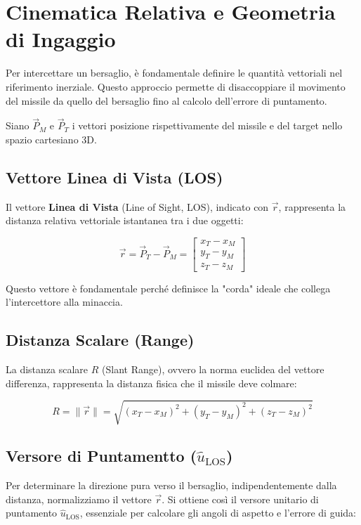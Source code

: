 \documentclass[12pt,a4paper]{article}
\begin{document}
\section{Cinematica Relativa e Geometria di Ingaggio}

Per intercettare un bersaglio, è fondamentale definire le quantità vettoriali nel riferimento inerziale. Questo approccio permette di disaccoppiare il movimento del missile da quello del bersaglio fino al calcolo dell'errore di puntamento.



Siano $\vec{P}_M$ e $\vec{P}_T$ i vettori posizione rispettivamente del missile e del target nello spazio cartesiano 3D.

\subsection{Vettore Linea di Vista (LOS)}
Il vettore \textbf{Linea di Vista} (Line of Sight, LOS), indicato con $\vec{r}$, rappresenta la distanza relativa vettoriale istantanea tra i due oggetti:

\begin{equation}
    \vec{r} = \vec{P}_T - \vec{P}_M = 
    \begin{bmatrix} 
        x_T - x_M \\ 
        y_T - y_M \\ 
        z_T - z_M 
    \end{bmatrix}
\end{equation}

Questo vettore è fondamentale perché definisce la "corda" ideale che collega l'intercettore alla minaccia.

\subsection{Distanza Scalare (Range)}
La distanza scalare $R$ (Slant Range), ovvero la norma euclidea del vettore differenza, rappresenta la distanza fisica che il missile deve colmare:

\begin{equation}
    R = \|\vec{r}\| = \sqrt{(x_T - x_M)^2 + (y_T - y_M)^2 + (z_T - z_M)^2}
\end{equation}

\subsection{Versore di Puntamentto ($\hat{u}_{\text{LOS}}$)}
Per determinare la direzione pura verso il bersaglio, indipendentemente dalla distanza, normalizziamo il vettore $\vec{r}$. Si ottiene così il versore unitario di puntamento $\hat{u}_{\text{LOS}}$, essenziale per calcolare gli angoli di aspetto e l'errore di guida:
\end{document}
